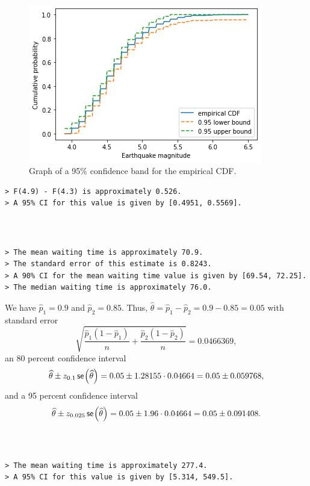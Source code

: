 \begin{ex}~
  \inputminted{python}{src/07-07.py}
  \begin{figure}[H]
    \centering
    \includegraphics[scale=1.1]{part2/ch07-07}
    \caption{Graph of a 95\% confidence band for the empirical CDF.}
  \end{figure}
  \begin{verbatim}
> F(4.9) - F(4.3) is approximately 0.526.
> A 95% CI for this value is given by [0.4951, 0.5569].
  \end{verbatim}
\end{ex}

\begin{ex}~
  \inputminted{python}{src/07-08.py}
  \begin{verbatim}
> The mean waiting time is approximately 70.9.
> The standard error of this estimate is 0.8243.
> A 90% CI for the mean waiting time value is given by [69.54, 72.25].
> The median waiting time is approximately 76.0.
  \end{verbatim}
\end{ex}

\begin{ex}
  We have $\widehat{p}_1=0.9$ and $\widehat{p}_2=0.85$. Thus,
  $\widehat{\theta}=\widehat{p}_1-\widehat{p}_2=0.9-0.85=0.05$ with standard
  error
  \[
    \sqrt{\frac{\widehat{p}_1(1-\widehat{p}_1)}{n}
      +\frac{\widehat{p}_2(1-\widehat{p}_2)}{n}}
    =0.0466369,
  \]
  an 80 percent confidence interval
  \[
    \widehat{\theta}\pm z_{0.1}\,\textsf{se}\mkern-2mu\left(\widehat{\theta} \right)
    =0.05\pm 1.28155\cdot 0.04664
    =0.05\pm 0.059768,
  \]
  and a 95 percent confidence interval
  \[
    \widehat{\theta}\pm z_{0.025}\,\textsf{se}\mkern-2mu\left(\widehat{\theta} \right)
    =0.05\pm 1.96\cdot 0.04664
    =0.05\pm 0.091408.
  \]
\end{ex}

\begin{ex}~
  \inputminted{python}{src/07-10.py}
  \begin{verbatim}
> The mean waiting time is approximately 277.4.
> A 95% CI for this value is given by [5.314, 549.5].
  \end{verbatim}
\end{ex}